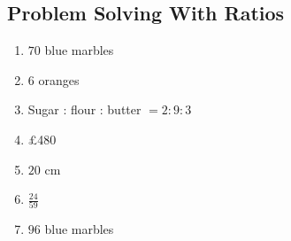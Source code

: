 \documentclass[12pt,a4paper]{article}
\begin{document}
\subsection*{Problem Solving With Ratios}
\begin{enumerate}
\item \(70\) blue marbles
\item \(6\) oranges
\item Sugar : flour : butter \(=2:9:3\)
\item \pounds480
\item \(20\) cm
\item \(\frac{24}{59}\)
\item \(96\) blue marbles
\end{enumerate}
\end{document}
